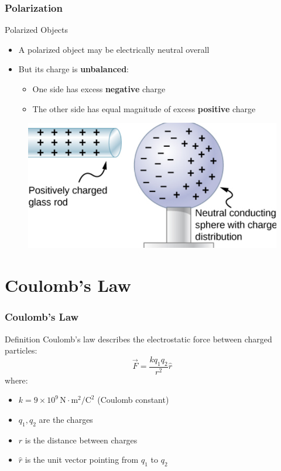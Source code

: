 \documentclass{beamer}
\begin{document}
\begin{frame}
    \frametitle{Polarization}
    \begin{block}{Polarized Objects}
        \begin{itemize}
            \item A polarized object may be electrically neutral overall
            \item But its charge is \textbf{unbalanced}:
                \begin{itemize}
                    \item One side has excess \textbf{negative} charge
                    \item The other side has equal magnitude of excess \textbf{positive} charge
                \end{itemize}
        \end{itemize}
    \end{block}
    
    
        \begin{figure}
            \centering
            \includegraphics[width=0.75\linewidth]{phys11-electrostatics-polarization.png}
        \end{figure}
    
\end{frame}

\section{Coulomb's Law}

\begin{frame}
    \frametitle{Coulomb's Law}
    \begin{block}{Definition}
        Coulomb's law describes the electrostatic force between charged particles:
        \begin{equation}
            \vec{F} = \frac{kq_1q_2}{r^2}\hat{r}
        \end{equation}
        where:
        \begin{itemize}
            \item $k = 9 \times 10^9 \, \text{N} \cdot \text{m}^2/\text{C}^2$ (Coulomb constant)
            \item $q_1, q_2$ are the charges
            \item $r$ is the distance between charges
            \item $\hat{r}$ is the unit vector pointing from $q_1$ to $q_2$
        \end{itemize}
    \end{block}
\end{frame}
\end{document}
